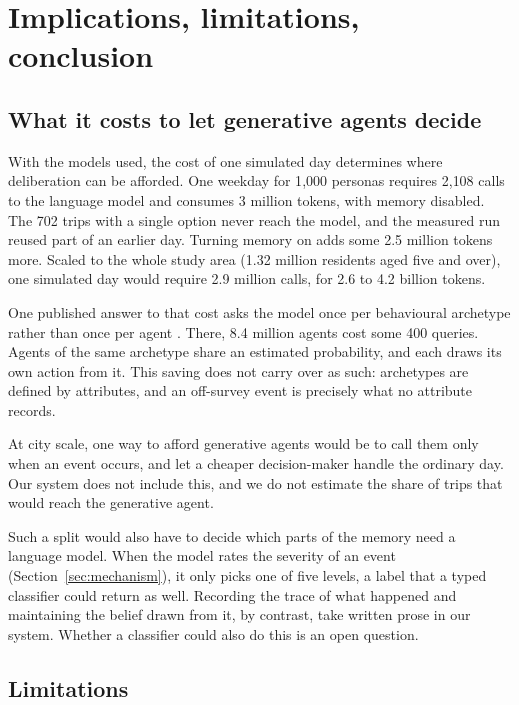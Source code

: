 \section{Implications, limitations, conclusion}
\label{sec:implications}

\subsection{What it costs to let generative agents decide}
\label{sec:cost-of-deciding}

With the models used, the cost of one simulated day determines where deliberation can be
afforded. One weekday for 1{,}000 personas requires 2{,}108 calls to the language model and
consumes 3 million tokens, with memory disabled. The 702 trips with a single option never
reach the model, and the measured run reused part of an earlier day. Turning memory on adds
some 2.5 million tokens more. Scaled to the whole study area (1.32 million residents aged
five and over), one simulated day would require 2.9 million calls, for 2.6 to 4.2 billion
tokens.

One published answer to that cost asks the model once per behavioural archetype rather
than once per agent \citep{chopra2024limits}. There, 8.4 million agents cost some 400
queries. Agents of the same archetype share an estimated probability, and each draws its own
action from it. This saving does not carry over as such: archetypes are defined by
attributes, and an off-survey event is precisely what no attribute records.

At city scale, one way to afford generative agents would be to call them only when an event
occurs, and let a cheaper decision-maker handle the ordinary day. Our system does not include
this, and we do not estimate the share of trips that would reach the generative agent.

Such a split would also have to decide which parts of the memory need a language model. When
the model rates the severity of an event (Section~\ref{sec:mechanism}), it only picks one of
five levels, a label that a typed classifier could return as well. Recording the trace of what
happened and maintaining the belief drawn from it, by contrast, take written prose in our
system. Whether a classifier could also do this is an open question.

\subsection{Limitations}
\label{sec:limitations}

